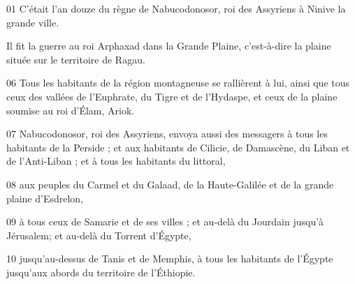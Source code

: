 01 C’était l'an douze du règne de Nabucodonosor, roi des Assyriens à Ninive la grande ville.

Il fit la guerre au roi Arphaxad dans la Grande Plaine, c'est-à-dire la plaine située sur le territoire de Ragau.

06 Tous les habitants de la région montagneuse se rallièrent à lui, ainsi que tous ceux des vallées de l'Euphrate, du Tigre et de l'Hydaspe, et ceux de la plaine soumise au roi d'Élam, Ariok.

07 Nabucodonosor, roi des Assyriens, envoya aussi des messagers à tous les habitants de la Perside ; et aux habitants de Cilicie, de Damascène, du Liban et de l'Anti-Liban ; et à tous les habitants du littoral,

08 aux peuples du Carmel et du Galaad, de la Haute-Galilée et de la grande plaine d'Esdrelon,

09 à tous ceux de Samarie et de ses villes ; et au-delà du Jourdain jusqu'à Jérusalem; et au-delà du Torrent d'Égypte,

10 jusqu'au-dessus de Tanis et de Memphis, à tous les habitants de l'Égypte jusqu'aux abords du territoire de l'Éthiopie.
